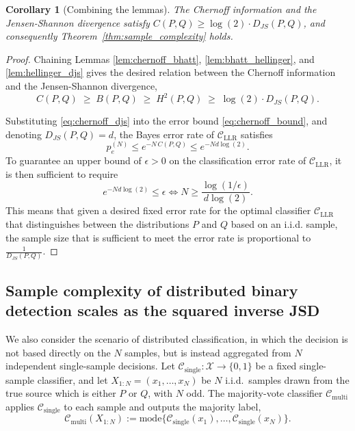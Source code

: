 \documentclass{article}
\newtheorem{corollary}{Corollary}
\begin{document}
\begin{corollary}[Combining the lemmas]
\label{cor:combining}
The Chernoff information and the Jensen-Shannon divergence satisfy $C(P,Q) \geq \log(2)\cdot D_{JS}(P,Q)$, and consequently Theorem~\ref{thm:sample_complexity} holds.
\end{corollary}
\begin{proof}
Chaining Lemmas \ref{lem:chernoff_bhatt}, \ref{lem:bhatt_hellinger}, and \ref{lem:hellinger_djs} gives the desired relation between the Chernoff information and the Jensen-Shannon divergence,
\begin{equation}
    C(P,Q) \;\geq\; B(P,Q) \;\geq\; H^{2}(P,Q) \;\geq\; \log(2) \cdot D_{JS}(P,Q).
\label{eq:chernoff_djs}
\end{equation}
 
Substituting \eqref{eq:chernoff_djs} into the error bound \eqref{eq:chernoff_bound}, and denoting $D_{JS}(P,Q)=d$, the Bayes error rate of $\mathcal{C}_{\text{LLR}}$ satisfies
\begin{equation}
    p_e^{(N)} \leq e^{-N\,C(P,Q)} \leq e^{-N d \log(2)}.
\label{eq:err_djs_bound}
\end{equation}
To guarantee an upper bound of $\epsilon>0$ on the classification error rate of $\mathcal{C}_{\text{LLR}}$, it is then sufficient to require
\begin{equation}
    e^{-N d \log(2)} \leq \epsilon \iff N \geq \frac{\log(1/\epsilon)}{d \log(2)}.
\label{eq:final_N_bound_opt}
\end{equation}
This means that given a desired fixed error rate for the optimal classifier $\mathcal{C}_{\text{LLR}}$ that distinguishes between the distributions $P$ and $Q$ based on an i.i.d. sample, the sample size that is sufficient to meet the error rate is proportional to $\frac{1}{D_{JS}(P,Q)}$.
\end{proof}

\subsection*{Sample complexity of distributed binary detection scales as the squared inverse JSD}

We also consider the scenario of distributed classification, in which the decision is not based directly on the $N$ samples, but is instead aggregated from $N$ independent single-sample decisions. Let $\mathcal{C}_{\text{single}}: \mathcal{X}\to\{0,1\}$ be a fixed single-sample classifier, and let $X_{1:N}=(x_1,\dots,x_N)$ be $N$ i.i.d.\ samples drawn from the true source which is either $P$ or $Q$, with $N$ odd. The majority-vote classifier $\mathcal{C}_{\text{multi}}$ applies $\mathcal{C}_{\text{single}}$ to each sample and outputs the majority label,
\begin{equation}
\mathcal{C}_{\text{multi}}(X_{1:N}) := \mathrm{mode}\big\{\mathcal{C}_{\text{single}}(x_1),\dots,\mathcal{C}_{\text{single}}(x_N)\big\}.
\end{equation}
\end{document}
